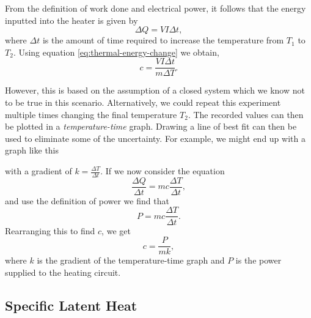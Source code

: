 From the definition of work done and electrical power, it follows that the energy inputted into the heater is given by
\begin{equation*}
    \Delta Q = VI\Delta t,
\end{equation*}
where $\Delta t$ is the amount of time required to increase the temperature from $T_1$ to $T_2$. Using equation \ref{eq:thermal-energy-change} we obtain,
\begin{equation*}
    c = \frac{VI \Delta t}{m \Delta T}.
\end{equation*}

However, this is based on the assumption of a closed system which we know not to be true in this scenario. Alternatively, we could repeat this experiment multiple times changing the final temperature $T_2$. The recorded values can then be plotted in a \textit{temperature-time} graph. Drawing a line of best fit can then be used to eliminate some of the uncertainty. For example, we might end up with a graph like this


\begin{figure}[h!]
    \centering
\end{figure}
\FloatBarrier

\noindent with a gradient of $k = \frac{\Delta T}{\Delta t}$. If we now consider the equation
\begin{equation*}
    \frac{\Delta Q}{\Delta t} = mc \frac{\Delta T}{\Delta t},
\end{equation*}
and use the definition of power we find that
\begin{equation*}
    P = mc \frac{\Delta T}{\Delta t}.
\end{equation*}
Rearranging this to find $c$, we get
\begin{equation*}
    c = \frac{P}{mk},
\end{equation*}
where $k$ is the gradient of the temperature-time graph and $P$ is the power supplied to the heating circuit. 

\subsection{Specific Latent Heat}

